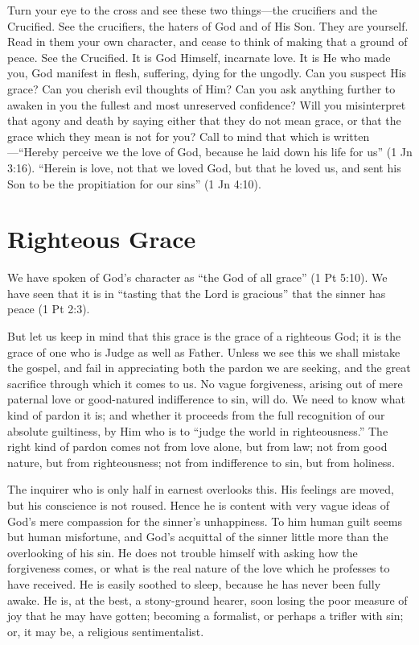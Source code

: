 \documentclass[
]{book}
\begin{document}
Turn your eye to the cross and see these two things---the crucifiers and the Crucified. See the crucifiers, the haters of God and of His Son. They are yourself. Read in them your own character, and cease to think of making that a ground of peace. See the Crucified. It is God Himself, incarnate love. It is He who made you, God manifest in flesh, suffering, dying for the ungodly. Can you suspect His grace? Can you cherish evil thoughts of Him? Can you ask anything further to awaken in you the fullest and most unreserved confidence? Will you misinterpret that agony and death by saying either that they do not mean grace, or that the grace which they mean is not for you? Call to mind that which is written---``Hereby perceive we the love of God, because he laid down his life for us'' (1 Jn 3:16). ``Herein is love, not that we loved God, but that he loved us, and sent his Son to be the propitiation for our sins'' (1 Jn 4:10).

\hypertarget{righteous-grace}{%
\chapter{Righteous Grace}\label{righteous-grace}}

We have spoken of God's character as ``the God of all grace'' (1 Pt 5:10). We have seen that it is in ``tasting that the Lord is gracious'' that the sinner has peace (1 Pt 2:3).

But let us keep in mind that this grace is the grace of a righteous God; it is the grace of one who is Judge as well as Father. Unless we see this we shall mistake the gospel, and fail in appreciating both the pardon we are seeking, and the great sacrifice through which it comes to us. No vague forgiveness, arising out of mere paternal love or good-natured indifference to sin, will do. We need to know what kind of pardon it is; and whether it proceeds from the full recognition of our absolute guiltiness, by Him who is to ``judge the world in righteousness.'' The right kind of pardon comes not from love alone, but from law; not from good nature, but from righteousness; not from indifference to sin, but from holiness.

The inquirer who is only half in earnest overlooks this. His feelings are moved, but his conscience is not roused. Hence he is content with very vague ideas of God's mere compassion for the sinner's unhappiness. To him human guilt seems but human misfortune, and God's acquittal of the sinner little more than the overlooking of his sin. He does not trouble himself with asking how the forgiveness comes, or what is the real nature of the love which he professes to have received. He is easily soothed to sleep, because he has never been fully awake. He is, at the best, a stony-ground hearer, soon losing the poor measure of joy that he may have gotten; becoming a formalist, or perhaps a trifler with sin; or, it may be, a religious sentimentalist.
\end{document}
